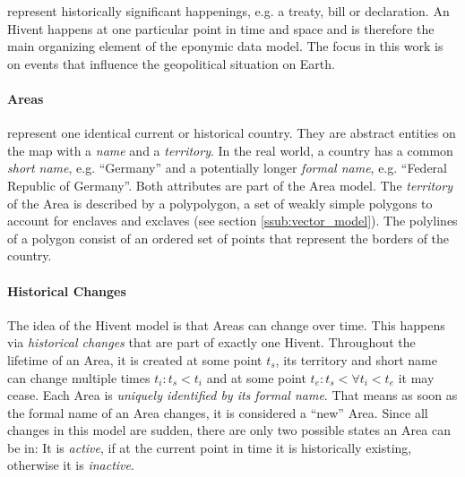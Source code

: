 represent historically significant happenings, e.g. a treaty, bill or declaration.
An Hivent happens at one particular point in time and space and is therefore the main organizing element of the eponymic data model.
The focus in this work is on events that influence the geopolitical situation on Earth.


\vspace{-1em}
\paragraph{Areas} %
\label{par:area}

represent one identical current or historical country. They are abstract entities on the map with a \emph{name} and a \emph{territory}. In the real world, a country has a common \emph{short name}, e.g. ``Germany'' and a potentially longer \emph{formal name}, e.g. ``Federal Republic of Germany''. Both attributes are part of the Area model. The \emph{territory} of the Area is described by a polypolygon, a set of weakly simple polygons to account for enclaves and exclaves (see section \ref{ssub:vector_model}). The polylines of a polygon consist of an ordered set of points that represent the borders of the country.


\vspace{-1em}
\paragraph{Historical Changes} %
\label{par:historical_changes}

The idea of the Hivent model is that Areas can change over time. This happens via \emph{historical changes} that are part of exactly one Hivent. Throughout the lifetime of an Area, it is created at some point $t_s$, its territory and short name can change multiple times $t_i: t_s < t_i$ and at some point $t_e: t_s < \forall t_i < t_e$ it may cease.
Each Area is \emph{uniquely identified by its formal name}. That means as soon as the formal name of an Area changes, it is considered a ``new'' Area.
Since all changes in this model are sudden, there are only two possible states an Area can be in: It is \emph{active}, if at the current point in time it is historically existing, otherwise it is \emph{inactive}.

